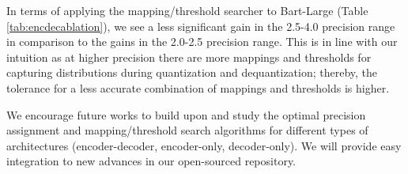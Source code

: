 In terms of applying the mapping/threshold searcher to Bart-Large (Table \ref{tab:encdecablation}), we see a less significant gain in the 2.5-4.0 precision range in comparison to the gains in the 2.0-2.5 precision range. This is in line with our intuition as at higher precision there are more mappings and thresholds for capturing distributions during quantization and dequantization; thereby, the tolerance for a less accurate combination of mappings and thresholds is higher.

We encourage future works to build upon \FWName{} and study the optimal precision assignment and mapping/threshold search algorithms for different types of architectures (\ie encoder-decoder, encoder-only, decoder-only). We will provide easy integration to new advances in our open-sourced repository.